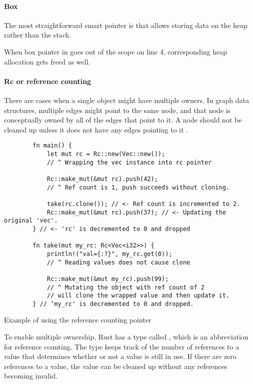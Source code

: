 \paragraph{Box}
The most straightforward smart pointer is  that allows storing data on the heap rather than the stack.

When box pointer in  goes out of the scope on line 4, corresponding heap allocation gets freed as well.

\paragraph{Rc or reference counting}
There are cases when a single object might have multiple owners. In graph data structures, multiple edges might point to the same node, and that node is conceptually owned by all of the edges that point to it. A node should not be cleaned up unless it does not have any edges pointing to it \cite{rust-book-2e}.

\begin{listing}[!ht]

    \centering
    \begin{verbatim}
        fn main() {
            let mut rc = Rc::new(Vec::new());
            // ^ Wrapping the vec instance into rc pointer

            Rc::make_mut(&mut rc).push(42);
            // ^ Ref count is 1, push succeeds without cloning.

            take(rc.clone()); // <- Ref count is incremented to 2.
            Rc::make_mut(&mut rc).push(37); // <- Updating the original 'vec'.
        } // <- 'rc' is decremented to 0 and dropped

        fn take(mut my_rc: Rc<Vec<i32>>) {
            println!("val={:?}", my_rc.get(0));
            // ^ Reading values does not cause clone

            Rc::make_mut(&mut my_rc).push(99);
            // ^ Mutating the object with ref count of 2
            // will clone the wrapped value and then update it.
        } // ‘my_rc' is decremented to 0 and dropped.
    \end{verbatim}

    \caption{Example of using the reference counting pointer}
    \label{lst:rc}
\end{listing}

To enable multiple ownership, Rust has a type called , which is an abbreviation for reference counting. The  type keeps track of the number of references to a value that determines whether or not a value is still in use. If there are zero references to a value, the value can be cleaned up without any references becoming invalid.

